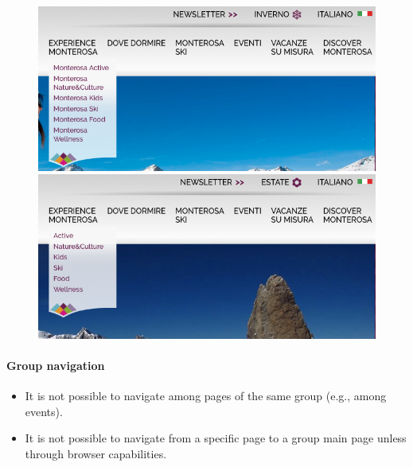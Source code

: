 \documentclass[a4paper, 11pt, parskip=half, headsepline]{scrreprt}
\begin{document}
\begin{figure}[H]
    \begin{minipage}[t]{0.5\textwidth}
        \centering
        \includegraphics[width=1\linewidth, keepaspectratio]{15-interaction-consistency}
        \caption{}
        \label{fig:interaction-consistency-05}
    \end{minipage}   
    \hspace*{\fill}
    \begin{minipage}[t]{0.5\textwidth}
        \centering
        \includegraphics[width=1\linewidth, keepaspectratio]{16-interaction-consistency}
        \caption{}
        \label{fig:interaction-consistency-06}
    \end{minipage} 
\end{figure}

\paragraph{Group navigation}
\begin{itemize}
    \item It is not possible to navigate among pages of the same group (e.g., among events).
    \item It is not possible to navigate from a specific page to a group main page unless through browser capabilities.
\end{itemize}
\end{document}
